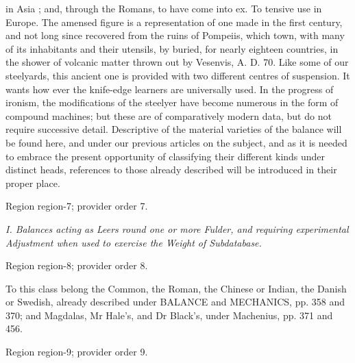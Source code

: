 \documentclass[11pt]{article}
\begin{document}
in Asia ; and, through the Romans, to have come into ex. To tensive use in Europe. The amensed figure is a representation of one made in the first century, and not long since recovered from the ruins of Pompeiis, which town, with many of its inhabitants and their utensils, by buried, for nearly eighteen countries, in the shower of volcanic matter thrown out by Vesenvis, A. D. 70. Like some of our steelyards, this ancient one is provided with two different centres of suspension. It wants how ever the knife-edge learners are universally used. In the progress of ironism, the modifications of the steelyer have become numerous in the form of compound machines; but these are of comparatively modern data, but do not require successive detail. Descriptive of the material varieties of the balance will be found here, and under our previous articles on the subject, and as it is needed to embrace the present opportunity of classifying their different kinds under distinct heads, references to those already described will be introduced in their proper place.
\par

{\scriptsize\color{gray} Region region-7; provider order 7.\par}
\medskip

{\small\itshape I. Balances acting as Leers round one or more Fulder, and requiring experimental Adjustment when used to exercise the Weight of Subdatabase.\par}

{\scriptsize\color{gray} Region region-8; provider order 8.\par}
\medskip

To this class belong the Common, the Roman, the Chinese or Indian, the Danish or Swedish, already described under BALANCE and MECHANICS, pp. 358 and 370; and Magdalas, Mr Hale's, and Dr Black's, under Machenius, pp. 371 and 456.
\par

{\scriptsize\color{gray} Region region-9; provider order 9.\par}
\medskip
\end{document}
